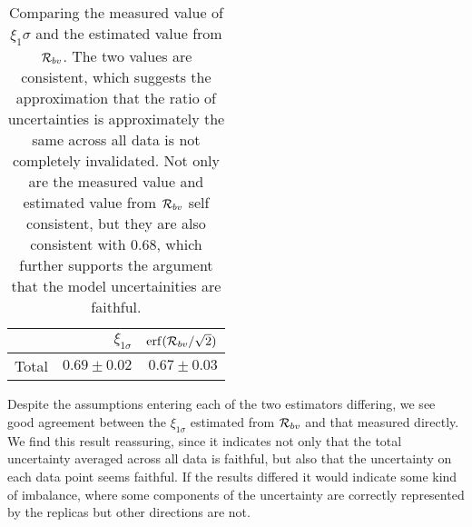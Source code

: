 \begin{table}[hb]
    \begin{center}
        \begin{tabular}{lrr}
            \toprule
            {}     & $\xi_{1\sigma}$ & ${\rm erf}(\mathcal{R}_{bv}/\sqrt{2})$ \\
            \midrule
            Total  & $0.69\pm0.02$   & $0.67\pm0.03$                  \\
            \bottomrule
            \end{tabular}
    \end{center}
    \caption{
        Comparing the measured value of $\xi_1\sigma$ and the estimated
        value from $\mathcal{R}_{bv}$. The two values are consistent, which
        suggests the approximation that the ratio of uncertainties is
        approximately the same across all data is not completely invalidated.
        Not only are the measured value and estimated value from $\mathcal{R}_{bv}$
        self consistent, but they are also consistent with $0.68$, which
        further supports the argument that the model uncertainities are
        faithful.
    }
    \label{tab:xicomparison}
\end{table}

Despite the assumptions entering each of the two estimators differing, we see
good agreement between the $\xi_{1\sigma}$ estimated from $\mathcal{R}_{bv}$
and that measured directly. We find this result reassuring, since it indicates
not only that the total uncertainty averaged across all data is faithful, but
also that the uncertainty on each data point seems faithful. If the results
differed it would indicate some kind of imbalance, where some components
of the uncertainty are correctly represented by the replicas but other directions
are not.
